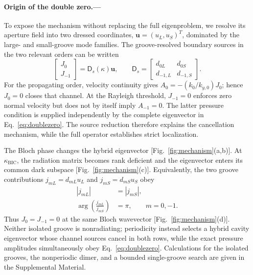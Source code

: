 \documentclass[aps,prl,reprint,superscriptaddress,nofootinbib,floatfix]{revtex4-2}
\newcommand{\BIC}{\mathrm{BIC}}
\begin{document}
\paragraph{Origin of the double zero.---}
To expose the mechanism without replacing the full eigenproblem, we resolve
its aperture field into two dressed coordinates,
$\bm u=(u_L,u_S)^T$, dominated by the large- and small-groove mode families.
The groove-resolved boundary sources in the two relevant orders can be written
\begin{equation}
 \begin{bmatrix}J_0\\J_{-1}\end{bmatrix}
 =\mathsf D_s(\kappa)\bm u,
 \qquad
 \mathsf D_s=\begin{bmatrix}
 d_{0L}&d_{0S}\\ d_{-1,L}&d_{-1,S}
 \end{bmatrix}.
 \label{eq:radiationmatrix}
\end{equation}
For the propagating order, velocity continuity gives
$A_0=-(k_0/k_{y,0})J_0$; hence $J_0=0$ closes that channel.  At the Rayleigh
threshold, $J_{-1}=0$ enforces zero normal velocity but does not by itself
imply $A_{-1}=0$.  The latter pressure condition is supplied independently by
the complete eigenvector in Eq.~\eqref{eq:doublezero}.  The source reduction
therefore explains the cancellation mechanism, while the full operator
establishes strict localization.

The Bloch phase changes the hybrid eigenvector [Fig.~\ref{fig:mechanism}(a,b)].
At $\kappa_{\BIC}$, the radiation matrix becomes rank deficient and the
eigenvector enters its common dark subspace [Fig.~\ref{fig:mechanism}(c)].
Equivalently, the two groove
contributions $j_{mL}=d_{mL}u_L$ and $j_{mS}=d_{mS}u_S$ obey
\begin{equation}
 \begin{aligned}
 |j_{mL}|&=|j_{mS}|,\\
 \arg\!\left(\frac{j_{mL}}{j_{mS}}\right)&=\pi,
 \qquad m=0,-1.
 \end{aligned}
 \label{eq:phasorcondition}
\end{equation}
Thus $J_0=J_{-1}=0$ at the same Bloch wavevector
[Fig.~\ref{fig:mechanism}(d)].  Neither isolated groove is nonradiating;
periodicity instead selects a hybrid cavity eigenvector whose channel sources
cancel in both rows, while the exact pressure amplitudes simultaneously obey
Eq.~\eqref{eq:doublezero}.  Calculations for the isolated grooves, the
nonperiodic dimer, and a bounded single-groove search are given in the
Supplemental Material.
\end{document}
